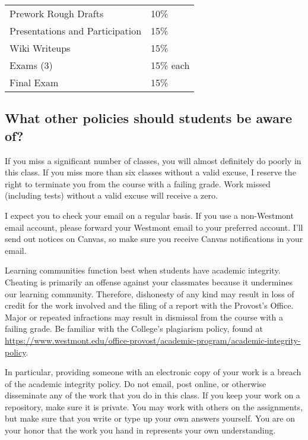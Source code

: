\documentclass[
  twoside]{article}
\begin{document}
\begin{tabular}[t]{ll}
\toprule
Prework Rough Drafts & 10\%\\
Presentations and Participation & 15\%\\
Wiki Writeups & 15\%\\
Exams (3) & 15\% each\\
Final Exam & 15\%\\
\bottomrule
\end{tabular}

\hypertarget{what-other-policies-should-students-be-aware-of}{%
\subsection{What other policies should students be aware
of?}\label{what-other-policies-should-students-be-aware-of}}

If you miss a significant number of classes, you will almost definitely
do poorly in this class. If you miss more than six classes without a
valid excuse, I reserve the right to terminate you from the course with
a failing grade. Work missed (including tests) without a valid excuse
will receive a zero.

I expect you to check your email on a regular basis. If you use a
non-Westmont email account, please forward your Westmont email to your
preferred account. I'll send out notices on Canvas, so make sure you
receive Canvas notifications in your email.

Learning communities function best when students have academic
integrity. Cheating is primarily an offense against your classmates
because it undermines our learning community. Therefore, dishonesty of
any kind may result in loss of credit for the work involved and the
filing of a report with the Provost's Office. Major or repeated
infractions may result in dismissal from the course with a failing
grade. Be familiar with the College's plagiarism policy, found at
\url{https://www.westmont.edu/office-provost/academic-program/academic-integrity-policy}.

In particular, providing someone with an electronic copy of your work is
a breach of the academic integrity policy. Do not email, post online, or
otherwise disseminate any of the work that you do in this class. If you
keep your work on a repository, make sure it is private. You may work
with others on the assignments, but make sure that you write or type up
your own answers yourself. You are on your honor that the work you hand
in represents your own understanding.
\end{document}
